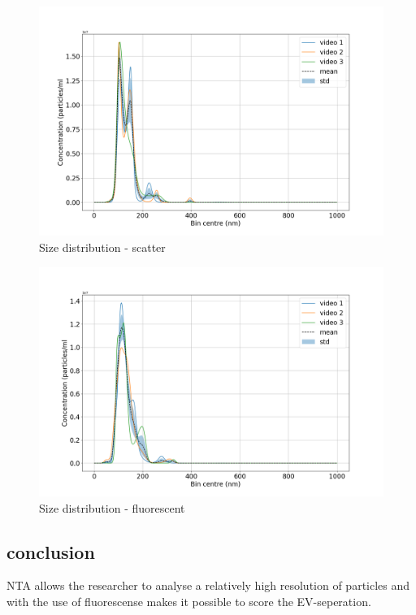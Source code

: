 \documentclass[dutch, a4paper, 11pt]{article}
\begin{document}
\begin{multicols}{2}
\vspace*{-0.5cm}
\begin{figure}[H]
    \centering
    \includegraphics[scale=0.2]{fig_scatter.png}
    \caption{Size distribution - scatter}
    \label{F1}
\end{figure}
\vspace*{-0.5cm}
\begin{figure}[H]
    \centering
    \includegraphics[scale=0.2]{fig_fluo.png}
    \caption{Size distribution - fluorescent}
    \label{F2}
\end{figure}

\subsection{conclusion}

NTA allows the researcher to analyse a relatively high resolution of particles and with the use of
fluorescense makes it possible to score the EV-seperation.


\end{multicols}
\end{document}
